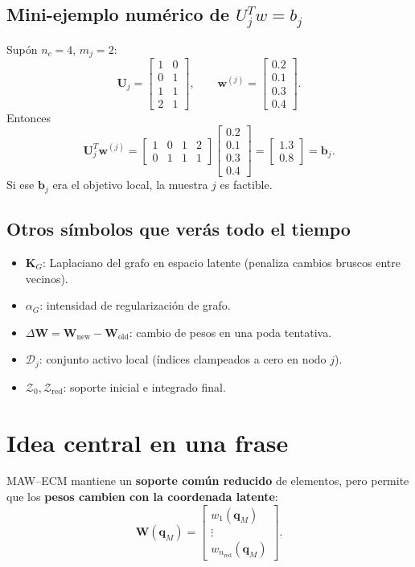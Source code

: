 \documentclass[11pt,a4paper]{article}
\newcommand{\W}{\bm W}
\newcommand{\U}{\bm U}
\newcommand{\K}{\bm K}
\begin{document}
\subsection{Mini-ejemplo num\'erico de $U_j^T w = b_j$}
Sup\'on $n_c=4$, $m_j=2$:
\[
\U_j=
\begin{bmatrix}
1 & 0\\
0 & 1\\
1 & 1\\
2 & 1
\end{bmatrix},
\qquad
\bm w^{(j)}=
\begin{bmatrix}
0.2\\0.1\\0.3\\0.4
\end{bmatrix}.
\]
Entonces
\[
\U_j^T\bm w^{(j)}=
\begin{bmatrix}
1 & 0 & 1 & 2\\
0 & 1 & 1 & 1
\end{bmatrix}
\begin{bmatrix}
0.2\\0.1\\0.3\\0.4
\end{bmatrix}
=
\begin{bmatrix}
1.3\\0.8
\end{bmatrix}
=\bm b_j.
\]
Si ese $\bm b_j$ era el objetivo local, la muestra $j$ es factible.

\subsection{Otros s\'imbolos que ver\'as todo el tiempo}
\begin{itemize}[leftmargin=0.8cm]
    \item $\K_G$: Laplaciano del grafo en espacio latente (penaliza cambios bruscos entre vecinos).
    \item $\alpha_G$: intensidad de regularizaci\'on de grafo.
    \item $\Delta\W=\W_{\text{new}}-\W_{\text{old}}$: cambio de pesos en una poda tentativa.
    \item $\mathcal D_j$: conjunto activo local (\'indices clampeados a cero en nodo $j$).
    \item $\mathcal Z_0,\mathcal Z_{\text{red}}$: soporte inicial e integrado final.
\end{itemize}

\section{Idea central en una frase}
MAW--ECM mantiene un \textbf{soporte com\'un reducido} de elementos,
pero permite que los \textbf{pesos cambien con la coordenada latente}:
\[
\W(\bm q_M)=
\begin{bmatrix}
w_1(\bm q_M)\\
\vdots\\
w_{n_{\text{red}}}(\bm q_M)
\end{bmatrix}.
\]
\end{document}
